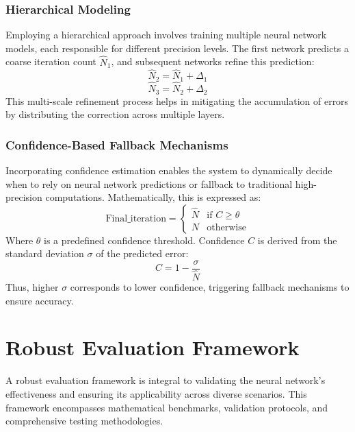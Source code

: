 \documentclass[journal]{IEEEaccess}
\begin{document}
\subsubsection{Hierarchical Modeling}
Employing a hierarchical approach involves training multiple neural network models, each responsible for different precision levels. The first network predicts a coarse iteration count \( \hat{N}_1 \), and subsequent networks refine this prediction:
\begin{equation}
    \hat{N}_2 = \hat{N}_1 + \Delta_1
\end{equation}
\begin{equation}
    \hat{N}_3 = \hat{N}_2 + \Delta_2
\end{equation}
This multi-scale refinement process helps in mitigating the accumulation of errors by distributing the correction across multiple layers.

\subsubsection{Confidence-Based Fallback Mechanisms}
Incorporating confidence estimation enables the system to dynamically decide when to rely on neural network predictions or fallback to traditional high-precision computations. Mathematically, this is expressed as:
\begin{equation}
    \text{Final\_iteration} =
    \begin{cases}
    \hat{N} & \text{if } C \geq \theta \\
    N & \text{otherwise}
    \end{cases}
\end{equation}
Where \( \theta \) is a predefined confidence threshold. Confidence \( C \) is derived from the standard deviation \( \sigma \) of the predicted error:
\begin{equation}
    C = 1 - \frac{\sigma}{\hat{N}}
\end{equation}
Thus, higher \( \sigma \) corresponds to lower confidence, triggering fallback mechanisms to ensure accuracy.

\section{Robust Evaluation Framework}
\label{sec:evaluation_framework}
A robust evaluation framework is integral to validating the neural network's effectiveness and ensuring its applicability across diverse scenarios. This framework encompasses mathematical benchmarks, validation protocols, and comprehensive testing methodologies.
\end{document}
